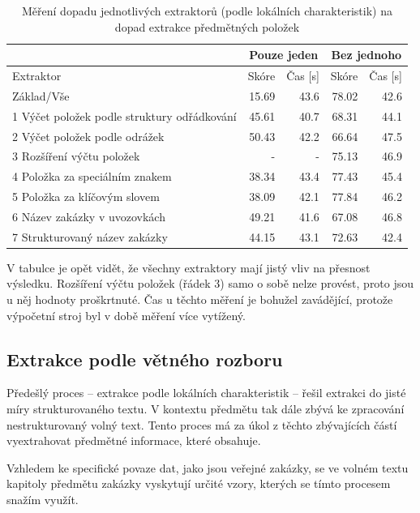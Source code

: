 \documentclass[thesis=M,czech]{FITthesis}[2019/12/23]
\begin{document}
\begin{table}
\centering
\begin{tabular}{ |l|r|r|r|r| }
\hline
 & \multicolumn{2}{|c|}{Pouze jeden} & \multicolumn{2}{|c|}{Bez jednoho} \\\hline
Extraktor & Skóre & Čas [s] & Skóre & Čas [s] \\\hline
\hline
Základ/Vše & 15.69 & 43.6 & 78.02 & 42.6\\\hline
1 Výčet položek podle struktury odřádkování & 45.61 & 40.7 & 68.31 & 44.1\\
2 Výčet položek podle odrážek & 50.43 & 42.2 & 66.64 & 47.5\\
3 Rozšíření výčtu položek & - & - & 75.13 & 46.9\\
4 Položka za speciálním znakem & 38.34 & 43.4 & 77.43 & 45.4\\\hline
5 Položka za klíčovým slovem & 38.09 & 42.1 & 77.84 & 46.2\\
6 Název zakázky v uvozovkách & 49.21 & 41.6 & 67.08 & 46.8\\
7 Strukturovaný název zakázky & 44.15 & 43.1 & 72.63 & 42.4\\\hline
\end{tabular}
\caption{Měření dopadu jednotlivých extraktorů (podle lokálních charakteristik) na dopad extrakce předmětných položek}
\label{table:experiment_extractors1}
\end{table}

V tabulce je opět vidět, že všechny extraktory mají jistý vliv na přesnost výsledku. Rozšíření výčtu položek (řádek 3) samo o sobě nelze provést, proto jsou u něj hodnoty proškrtnuté. Čas u těchto měření je bohužel zavádějící, protože výpočetní stroj byl v době měření více vytížený.


\subsection{Extrakce podle větného rozboru}
\label{sec:sentence_dependency_extraction}

Předešlý proces -- extrakce podle lokálních charakteristik -- řešil extrakci do jisté míry strukturovaného textu. V kontextu předmětu tak dále zbývá ke zpracování nestrukturovaný volný text. Tento proces má za úkol z těchto zbývajících částí vyextrahovat předmětné informace, které obsahuje.

Vzhledem ke specifické povaze dat, jako jsou veřejné zakázky, se ve volném textu kapitoly předmětu zakázky vyskytují určité vzory, kterých se tímto procesem snažím využít.
\end{document}
